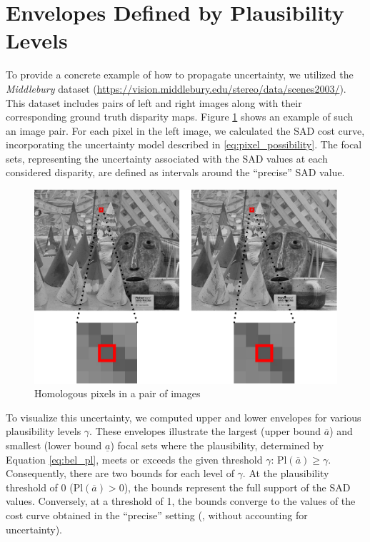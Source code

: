 \section{Envelopes Defined by Plausibility Levels}
To provide a concrete example of how to propagate uncertainty, we utilized the \textit{Middlebury} dataset (\url{https://vision.middlebury.edu/stereo/data/scenes2003/}). This dataset includes pairs of left and right images along with their corresponding ground truth disparity maps. Figure \ref{fig:Cones} shows an example of such an image pair.
For each pixel in the left image, we calculated the SAD cost curve, incorporating the uncertainty model described in \eqref{eq:pixel_possibility}. The focal sets, representing the uncertainty associated with the SAD values at each considered disparity, are defined as intervals around the ``precise'' SAD value.

\begin{figure}[ht]
  \centering
  \includegraphics[width=0.8\linewidth]{Images/Chap_4/Cones.png}
  \caption{Homologous pixels in a pair of images}\label{fig:Cones}
\end{figure}

To visualize this uncertainty, we computed upper and lower envelopes for various plausibility levels $\gamma$. These envelopes illustrate the largest (upper bound $\overline{a}$) and smallest (lower bound $\underline{a}$) focal sets where the plausibility, determined by Equation \eqref{eq:bel_pl}, meets or exceeds the given threshold $\gamma$: $\mathrm{Pl}(\overline{a}) \geqslant \gamma$. Consequently, there are two bounds for each level of $\gamma$.
At the plausibility threshold of 0 ($\mathrm{Pl}(\overline{a}) > 0$), the bounds represent the full support of the SAD values. Conversely, at a threshold of 1, the bounds converge to the values of the cost curve obtained in the ``precise'' setting (\ie, without accounting for uncertainty).

